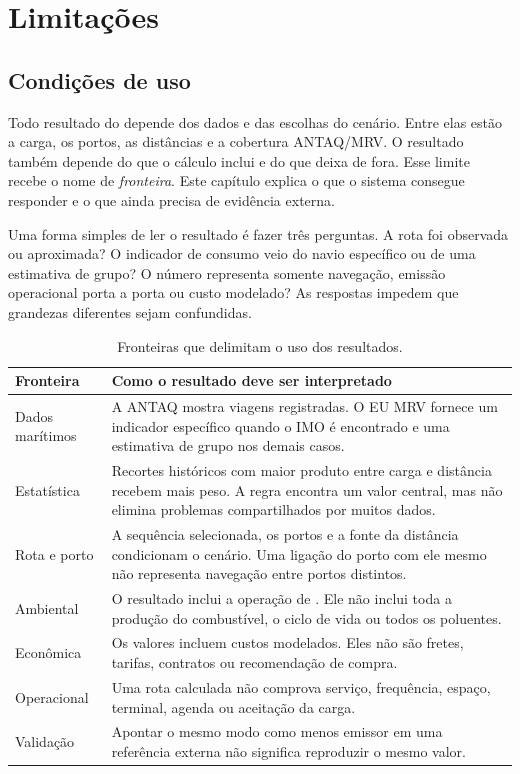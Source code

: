 \chapter{Limitações}
\label{ch:limitacoes}

\section{Condições de uso}
\label{sec:funcao-limitacoes}

Todo resultado do \CabotageLens{} depende dos dados e das escolhas do cenário. Entre elas estão a carga, os portos, as distâncias e a cobertura ANTAQ/MRV. O resultado também depende do que o cálculo inclui e do que deixa de fora. Esse limite recebe o nome de \emph{fronteira}. Este capítulo explica o que o sistema consegue responder e o que ainda precisa de evidência externa.

Uma forma simples de ler o resultado é fazer três perguntas. A rota foi observada ou aproximada? O indicador de consumo veio do navio específico ou de uma estimativa de grupo? O número representa somente navegação, emissão operacional porta a porta ou custo modelado? As respostas impedem que grandezas diferentes sejam confundidas.

\begin{table}[htbp]
\centering
\small
\caption{Fronteiras que delimitam o uso dos resultados.}
\label{tab:condicoes-uso}
\begin{tabularx}{\textwidth}{L{0.23\textwidth}Y}
\toprule
Fronteira & Como o resultado deve ser interpretado \\
\midrule
Dados marítimos & A ANTAQ mostra viagens registradas. O EU MRV fornece um indicador específico quando o IMO é encontrado e uma estimativa de grupo nos demais casos.\\
Estatística & Recortes históricos com maior produto entre carga e distância recebem mais peso. A regra encontra um valor central, mas não elimina problemas compartilhados por muitos dados.\\
Rota e porto & A sequência selecionada, os portos e a fonte da distância condicionam o cenário. Uma ligação do porto com ele mesmo não representa navegação entre portos distintos.\\
Ambiental & O resultado inclui a operação \ttw{} de \cooe{}. Ele não inclui toda a produção do combustível, o ciclo de vida ou todos os poluentes.\\
Econômica & Os valores incluem custos modelados. Eles não são fretes, tarifas, contratos ou recomendação de compra.\\
Operacional & Uma rota calculada não comprova serviço, frequência, espaço, terminal, agenda ou aceitação da carga.\\
Validação & Apontar o mesmo modo como menos emissor em uma referência externa não significa reproduzir o mesmo valor.\\
\bottomrule
\end{tabularx}
\end{table}

